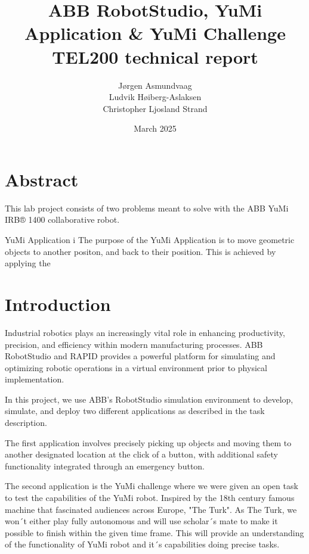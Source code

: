 \documentclass[a4paper,12pt]{article}
\begin{document}
\begin{titlepage}
    \centering
    \vfill
    
    \title{ABB RobotStudio, YuMi Application \& YuMi Challenge \\ \large TEL200 technical report}
    \author{J\o rgen Asmundvaag \\ Ludvik H\o iberg-Aslaksen \\ Christopher Ljosland Strand}
    \date{March 2025}
    \maketitle
    
    \vfill
\end{titlepage}


\newpage
\tableofcontents

\newpage
\section{Abstract}
This lab project consists of two problems meant to solve with the ABB YuMi IRB® 1400 collaborative robot. 

YuMi Application i
The purpose of the YuMi Application is to move geometric objects to another positon, and back to their position. This is achieved by applying the 

\section{Introduction}
Industrial robotics plays an increasingly vital role in enhancing productivity, precision, and efficiency within modern manufacturing processes. ABB RobotStudio and RAPID provides a powerful platform for simulating and optimizing robotic operations in a virtual environment prior to physical implementation.

In this project, we use ABB's RobotStudio simulation environment to develop, simulate, and deploy two different applications as described in the task description. 

The first application involves precisely picking up objects and moving them to another designated location at the click of a button, with additional safety functionality integrated through an emergency button.

The second application is the YuMi challenge where we were given an open task to test the capabilities of the YuMi robot. Inspired by the 18th century famous machine that fascinated audiences across Europe, "The Turk". As The Turk, we won´t either play fully autonomous and will use scholar´s mate to make it possible to finish within the given time frame. This  will provide an understanding of the functionality of YuMi robot and it´s capabilities doing precise tasks.
\end{document}
